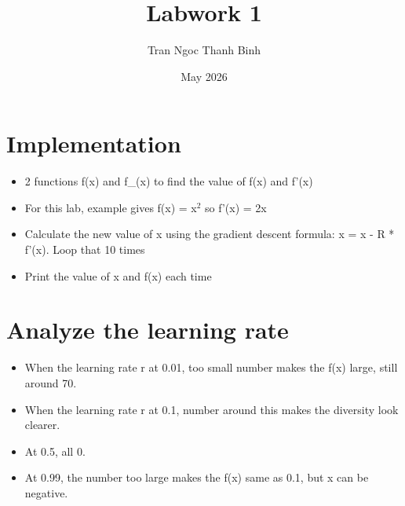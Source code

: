 \documentclass{article}
\title{Labwork 1}
\author{Tran Ngoc Thanh Binh}
\date{May 2026}
\begin{document}
\maketitle

\section{Implementation}
\begin{itemize}
    \item 2 functions f(x) and f\_(x) to find the value of f(x) and f'(x)
    \item For this lab, example gives f(x) = x$^2$ so f'(x) = 2x
    \item Calculate the new value of x using the gradient descent formula: x = x - R * f’(x). Loop that 10 times
    \item Print the value of x and f(x) each time
\end{itemize}


\section{Analyze the learning rate}
\begin{itemize}
    \item When the learning rate r at 0.01, too small number makes the f(x) large, still around 70.
    \item When the learning rate r at 0.1, number around this makes the diversity look clearer.
    \item At 0.5, all 0.
    \item At 0.99, the number too large makes the f(x) same as 0.1, but x can be negative.
\end{itemize}
\end{document}

